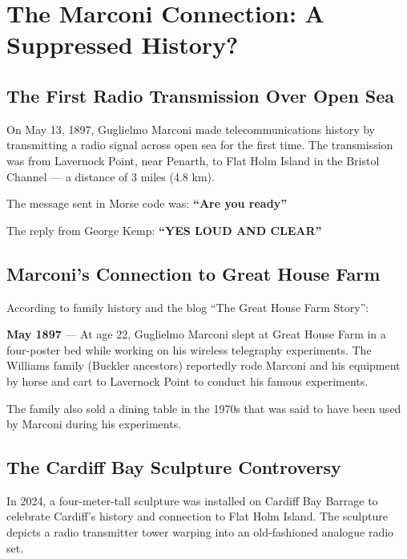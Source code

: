 \documentclass[11pt,a4paper]{article}
\begin{document}
\newpage

\section{The Marconi Connection: A Suppressed History?}

\subsection{The First Radio Transmission Over Open Sea}

\begin{keyfact}
On May 13, 1897, Guglielmo Marconi made telecommunications history by transmitting a radio signal across open sea for the first time. The transmission was from Lavernock Point, near Penarth, to Flat Holm Island in the Bristol Channel --- a distance of 3 miles (4.8 km).
\end{keyfact}

The message sent in Morse code was: \textbf{``Are you ready''}

The reply from George Kemp: \textbf{``YES LOUD AND CLEAR''}

\subsection{Marconi's Connection to Great House Farm}

According to family history and the blog ``The Great House Farm Story'':

\begin{timeline}
\textbf{May 1897} --- At age 22, Guglielmo Marconi slept at Great House Farm in a four-poster bed while working on his wireless telegraphy experiments. The Williams family (Buckler ancestors) reportedly rode Marconi and his equipment by horse and cart to Lavernock Point to conduct his famous experiments.
\end{timeline}

The family also sold a dining table in the 1970s that was said to have been used by Marconi during his experiments.

\subsection{The Cardiff Bay Sculpture Controversy}

\begin{keyfact}
In 2024, a four-meter-tall sculpture was installed on Cardiff Bay Barrage to celebrate Cardiff's history and connection to Flat Holm Island. The sculpture depicts a radio transmitter tower warping into an old-fashioned analogue radio set.
\end{keyfact}
\end{document}
